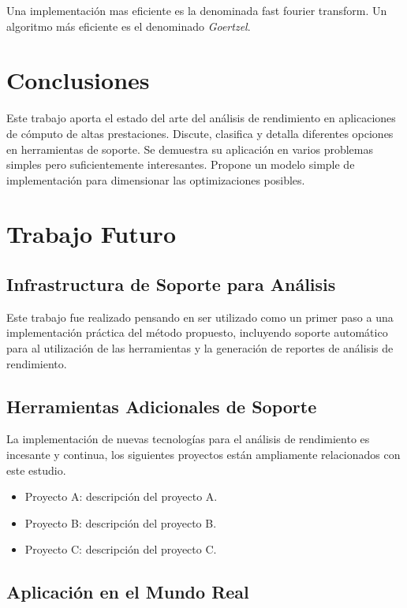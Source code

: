 \documentclass[a4paper]{report}
\begin{document}
Una implementaci\'on mas eficiente es la denominada fast fourier transform.
Un algoritmo m\'as eficiente es el denominado {\it Goertzel}.

\chapter{Conclusiones}

Este trabajo aporta el estado del arte del an\'alisis de rendimiento en
aplicaciones de c\'omputo de altas prestaciones. Discute, clasifica y detalla
diferentes opciones en herramientas de soporte. Se demuestra su aplicaci\'on
en varios problemas simples pero suficientemente interesantes. Propone un
modelo simple de implementaci\'on para dimensionar las optimizaciones posibles.

\chapter{Trabajo Futuro}

\section{Infrastructura de Soporte para An\'alisis}

Este trabajo fue realizado pensando en ser utilizado como un primer paso
a una implementaci\'on pr\'actica del m\'etodo propuesto, incluyendo soporte
autom\'atico para al utilizaci\'on de las herramientas y la generaci\'on de
reportes de an\'alisis de rendimiento.

\section{Herramientas Adicionales de Soporte}

La implementaci\'on de nuevas tecnolog\'ias para el an\'alisis de rendimiento
es incesante y continua, los siguientes proyectos est\'an ampliamente
relacionados con este estudio.

\begin{itemize}
\item Proyecto A: descripci\'on del proyecto A.
\item Proyecto B: descripci\'on del proyecto B.
\item Proyecto C: descripci\'on del proyecto C.
\end{itemize}

\section{Aplicaci\'on en el Mundo Real}
\end{document}
